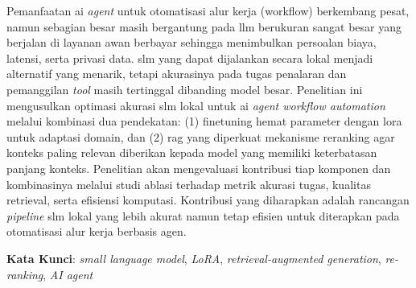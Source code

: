 Pemanfaatan \gls{ai} \textit{agent} untuk otomatisasi alur kerja (\gls{workflow}) berkembang pesat, namun sebagian besar masih bergantung pada \gls{llm} berukuran sangat besar yang berjalan di layanan awan berbayar sehingga menimbulkan persoalan biaya, latensi, serta privasi data. \gls{slm} yang dapat dijalankan secara lokal menjadi alternatif yang menarik, tetapi akurasinya pada tugas penalaran dan pemanggilan \textit{tool} masih tertinggal dibanding model besar. Penelitian ini mengusulkan optimasi akurasi \gls{slm} lokal untuk \gls{ai} \textit{agent workflow automation} melalui kombinasi dua pendekatan: (1) \gls{finetuning} hemat parameter dengan \gls{lora} untuk adaptasi domain, dan (2) \gls{rag} yang diperkuat mekanisme \gls{reranking} agar konteks paling relevan diberikan kepada model yang memiliki keterbatasan panjang konteks. Penelitian akan mengevaluasi kontribusi tiap komponen dan kombinasinya melalui studi ablasi terhadap metrik akurasi tugas, kualitas retrieval, serta efisiensi komputasi. Kontribusi yang diharapkan adalah rancangan \textit{pipeline} \gls{slm} lokal yang lebih akurat namun tetap efisien untuk diterapkan pada otomatisasi alur kerja berbasis agen.

\vspace{0.5\baselineskip}
\noindent\textbf{Kata Kunci}: \textit{small language model}, \textit{LoRA}, \textit{retrieval-augmented generation}, \textit{re-ranking}, \textit{AI agent}
